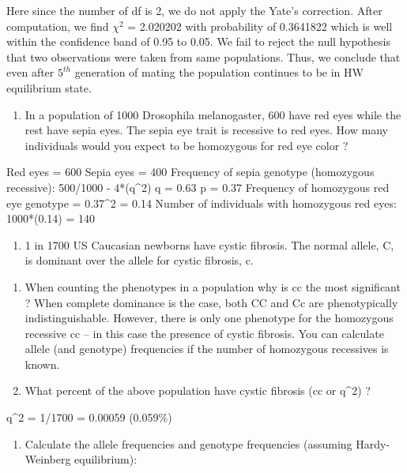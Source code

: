 \documentclass[nofonts,]{tufte-handout}
\providecommand{\tightlist}{%
  \setlength{\itemsep}{0pt}\setlength{\parskip}{0pt}}
\begin{document}
Here since the number of df is 2, we do not apply the Yate's correction.
After computation, we find \(\chi^2\) = 2.020202 with probability of
0.3641822 which is well within the confidence band of 0.95 to 0.05. We
fail to reject the null hypothesis that two observations were taken from
same populations. Thus, we conclude that even after \(5^{th}\)
generation of mating the population continues to be in HW equilibrium
state.

\begin{enumerate}
\def\labelenumi{\arabic{enumi}.}
\setcounter{enumi}{3}
\tightlist
\item
  In a population of 1000 Drosophila melanogaster, 600 have red eyes
  while the rest have sepia eyes. The sepia eye trait is recessive to
  red eyes. How many individuals would you expect to be homozygous for
  red eye color ?
\end{enumerate}

Red eyes = 600 Sepia eyes = 400 Frequency of sepia genotype (homozygous
recessive): 500/1000 - 4*(q\^{}2) q = 0.63 p = 0.37 Frequency of
homozygous red eye genotype = 0.37\^{}2 = 0.14 Number of individuals
with homozygous red eyes: 1000*(0.14) = 140

\begin{enumerate}
\def\labelenumi{\arabic{enumi}.}
\setcounter{enumi}{4}
\tightlist
\item
  1 in 1700 US Caucasian newborns have cystic fibrosis. The normal
  allele, C, is dominant over the allele for cystic fibrosis, c.
\end{enumerate}

\begin{enumerate}
\def\labelenumi{\alph{enumi}.}
\item
  When counting the phenotypes in a population why is cc the most
  significant ? When complete dominance is the case, both CC and Cc are
  phenotypically indistinguishable. However, there is only one phenotype
  for the homozygous recessive cc -- in this case the presence of cystic
  fibrosis. You can calculate allele (and genotype) frequencies if the
  number of homozygous recessives is known.
\item
  What percent of the above population have cystic fibrosis (cc or
  q\^{}2) ?
\end{enumerate}

q\^{}2 = 1/1700 = 0.00059 (0.059\%)

\begin{enumerate}
\def\labelenumi{\alph{enumi}.}
\setcounter{enumi}{2}
\tightlist
\item
  Calculate the allele frequencies and genotype frequencies (assuming
  Hardy-Weinberg equilibrium):
\end{enumerate}
\end{document}
